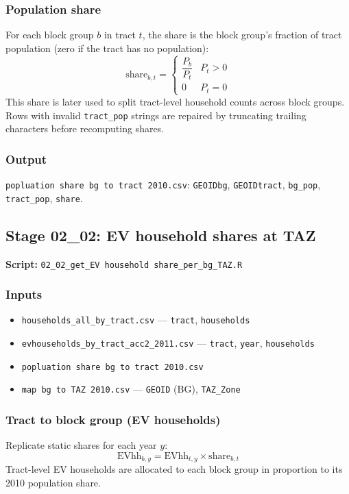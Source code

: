 \documentclass[11pt,a4paper]{article}
\begin{document}
\subsubsection{Population share}
For each block group $b$ in tract $t$, the share is the block group's fraction of tract population (zero if the tract has no population):
\begin{equation}
  \text{share}_{b,t} = \begin{cases}
    \dfrac{P_b}{P_t} & P_t > 0 \\
    0 & P_t = 0
  \end{cases}
\end{equation}
\noindent This share is later used to split tract-level household counts across block groups.
Rows with invalid \texttt{tract\_pop} strings are repaired by truncating trailing characters before recomputing shares.

\subsubsection{Output}
\texttt{popluation share bg to tract 2010.csv}: \texttt{GEOIDbg}, \texttt{GEOIDtract}, \texttt{bg\_pop}, \texttt{tract\_pop}, \texttt{share}.

\subsection{Stage 02\_02: EV household shares at TAZ}
\textbf{Script:} \texttt{02\_02\_get\_EV household share\_per\_bg\_TAZ.R}

\subsubsection{Inputs}
\begin{itemize}[noitemsep]
  \item \texttt{households\_all\_by\_tract.csv} --- \texttt{tract}, \texttt{households}
  \item \texttt{evhouseholds\_by\_tract\_acc2\_2011.csv} --- \texttt{tract}, \texttt{year}, \texttt{households}
  \item \texttt{popluation share bg to tract 2010.csv}
  \item \texttt{map bg to TAZ 2010.csv} --- \texttt{GEOID} (BG), \texttt{TAZ\_Zone}
\end{itemize}

\subsubsection{Tract to block group (EV households)}
Replicate static shares for each year $y$:
\begin{equation}
  \text{EVhh}_{b,y} = \text{EVhh}_{t,y} \times \text{share}_{b,t}
\end{equation}
\noindent Tract-level EV households are allocated to each block group in proportion to its 2010 population share.
\end{document}
